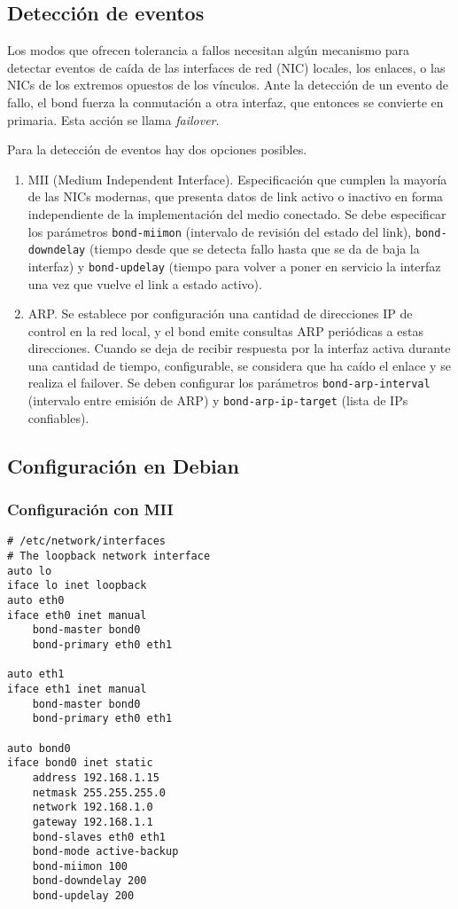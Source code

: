 \subsection {Detección de eventos}
Los modos que ofrecen tolerancia a fallos necesitan algún mecanismo para detectar eventos de caída de las interfaces de red (NIC) locales, los enlaces, o las NICs de los extremos opuestos de los vínculos. Ante la detección de un evento de fallo, el bond fuerza la conmutación a otra interfaz, que entonces se convierte en primaria. Esta acción se llama \emph{failover}.  

Para la detección de eventos hay dos opciones posibles.

\begin{enumerate}
		\item MII (Medium Independent Interface). Especificación que cumplen la mayoría de las NICs modernas, que presenta datos de link activo o inactivo en forma independiente de la implementación del medio conectado. Se debe especificar los parámetros \lstinline$bond-miimon$ (intervalo de revisión del estado del link), \lstinline$bond-downdelay$ (tiempo desde que se detecta fallo hasta que se da de baja la interfaz) y \lstinline$bond-updelay$ (tiempo para volver a poner en servicio la interfaz una vez que vuelve el link a estado activo). 
		\item ARP. Se establece por configuración una cantidad de direcciones IP de control en la red local, y el bond emite consultas ARP periódicas a estas direcciones. Cuando se deja de recibir respuesta por la interfaz activa durante una cantidad de tiempo, configurable, se considera que ha caído el enlace y se realiza el failover. Se deben configurar los parámetros \lstinline$bond-arp-interval$ (intervalo entre emisión de ARP) y \lstinline$bond-arp-ip-target$ (lista de IPs confiables).
\end{enumerate}
  
\subsection {Configuración en Debian}

\subsubsection {Configuración con MII}
\begin{lstlisting}
# /etc/network/interfaces
# The loopback network interface
auto lo
iface lo inet loopback
auto eth0
iface eth0 inet manual
	bond-master bond0
	bond-primary eth0 eth1

auto eth1
iface eth1 inet manual
	bond-master bond0
	bond-primary eth0 eth1

auto bond0
iface bond0 inet static
	address 192.168.1.15
	netmask 255.255.255.0
	network 192.168.1.0
	gateway 192.168.1.1
	bond-slaves eth0 eth1
	bond-mode active-backup
	bond-miimon 100
	bond-downdelay 200
	bond-updelay 200

\end{lstlisting}

